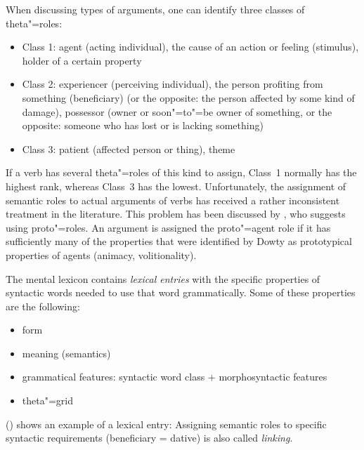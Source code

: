 \largerpage[2]
When discussing types of arguments, one can identify three classes of theta"=roles:
\begin{itemize}
\item Class 1: agent (acting individual), the cause of an action or feeling (stimulus), holder of a certain property
\item Class 2: experiencer (perceiving individual), the person profiting from something (beneficiary)
(or the opposite: the person affected by some kind of damage), possessor (owner or soon"=to"=be owner of something, or the opposite:
someone who has lost or is lacking something) 
\item Class 3: patient (affected person or thing), theme
\end{itemize}
If a verb has several theta"=roles of this kind to assign, Class~1 normally has the highest rank, whereas Class~3 has the lowest.
Unfortunately, the assignment of semantic roles to actual arguments of verbs has received a rather inconsistent treatment in the 
literature. This problem has been discussed by \citet{Dowty91a}, who suggests using proto"=roles. An argument is assigned the
proto"=agent role if it has sufficiently many of the properties that were identified by Dowty as prototypical properties of agents (\eg animacy, volitionality).%
\nocite{Gruber65a-u,Fillmore68,Fillmore71a-u,Jackendoff72a-u,Dowty91a}

The mental lexicon contains \emph{lexical entries} with the specific properties of syntactic words needed to use that word grammatically.
Some of these properties are the following:
\begin{itemize}
\item form
\item meaning (semantics)
\item grammatical features: syntactic word class $+$ morphosyntactic features   
\item theta"=grid
\end{itemize}

\noindent
() shows an example of a lexical entry:
\ea
{}
\z
Assigning semantic roles to specific syntactic requirements (beneficiary = dative) is also called \emph{linking}.

